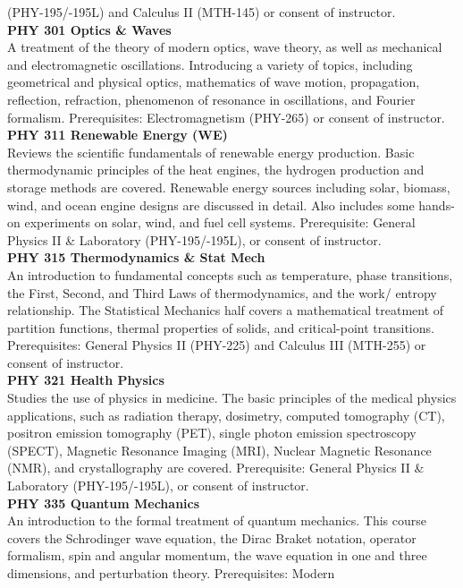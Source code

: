 \documentclass[
  letterpaper,
]{scrbook}
\begin{document}
(PHY-195/-195L) and Calculus II (MTH-145) or consent of instructor.\\
\textbf{PHY 301 Optics \& Waves}\\
A treatment of the theory of modern optics, wave theory, as well as
mechanical and electromagnetic oscillations. Introducing a variety of
topics, including geometrical and physical optics, mathematics of wave
motion, propagation, reflection, refraction, phenomenon of resonance in
oscillations, and Fourier formalism. Prerequisites: Electromagnetism
(PHY-265) or consent of instructor.\\
\textbf{PHY 311 Renewable Energy (WE)}\\
Reviews the scientific fundamentals of renewable energy production.
Basic thermodynamic principles of the heat engines, the hydrogen
production and storage methods are covered. Renewable energy sources
including solar, biomass, wind, and ocean engine designs are discussed
in detail. Also includes some hands-on experiments on solar, wind, and
fuel cell systems. Prerequisite: General Physics II \& Laboratory
(PHY-195/-195L), or consent of instructor.\\
\textbf{PHY 315 Thermodynamics \& Stat Mech}\\
An introduction to fundamental concepts such as temperature, phase
transitions, the First, Second, and Third Laws of thermodynamics, and
the work/ entropy relationship. The Statistical Mechanics half covers a
mathematical treatment of partition functions, thermal properties of
solids, and critical-point transitions. Prerequisites: General Physics
II (PHY-225) and Calculus III (MTH-255) or consent of instructor.\\
\textbf{PHY 321 Health Physics}\\
Studies the use of physics in medicine. The basic principles of the
medical physics applications, such as radiation therapy, dosimetry,
computed tomography (CT), positron emission tomography (PET), single
photon emission spectroscopy (SPECT), Magnetic Resonance Imaging (MRI),
Nuclear Magnetic Resonance (NMR), and crystallography are covered.
Prerequisite: General Physics II \& Laboratory (PHY-195/-195L), or
consent of instructor.\\
\textbf{PHY 335 Quantum Mechanics}\\
An introduction to the formal treatment of quantum mechanics. This
course covers the Schrodinger wave equation, the Dirac Braket notation,
operator formalism, spin and angular momentum, the wave equation in one
and three dimensions, and perturbation theory. Prerequisites: Modern
\end{document}
